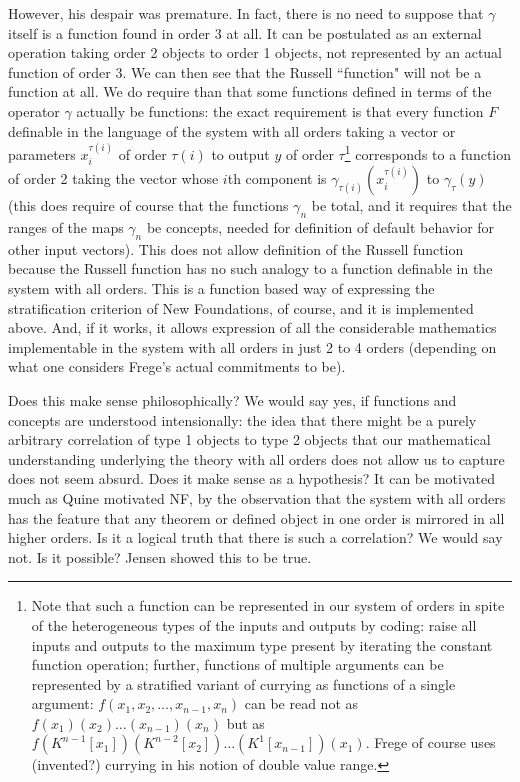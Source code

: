 \documentclass{article}
\begin{document}
{{However, his despair was premature.  In fact, there is no need to suppose that $\gamma$ itself is a function found in order 3 at all.  It can be postulated as an external operation taking order 2 objects to order 1 objects, not represented by an actual function of order 3.  We can then see that the Russell ``function" will not be a function at all.  We do require than that some functions defined in terms of the operator $\gamma$ actually be functions:  the exact requirement is that every function $F$ definable in the language of the system
with all orders taking a vector or parameters $x^{\tau(i)}_i$ of order $\tau(i)$ to output $y$ of order $\tau$\footnote{Note that such a function can be represented in our system of orders in spite of the heterogeneous types of the inputs and outputs by coding:  raise all inputs and outputs to the maximum type present by iterating the constant function operation; further, functions of multiple arguments can be represented by a stratified variant of currying as functions of a single argument:  $f(x_1,x_2,\ldots,x_{n-1},x_n)$ can be read not as $f(x_1)(x_2)\ldots(x_{n-1})(x_n)$ but as $f(K^{n-1}[x_1])(K^{n-2}[x_2])\ldots(K^{1}[x_{n-1}])(x_1)$.  Frege of course uses (invented?) currying in his notion of double value range.} corresponds to a function of order 2 taking the vector whose $i$th component is $\gamma_{\tau(i)}(x^{\tau(i)}_i)$ to $\gamma_{\tau}(y)$ (this does require of course that the functions $\gamma_n$ be total, and it requires that the ranges of the maps $\gamma_n$ be concepts, needed for definition of default behavior for other input vectors).  This does not allow definition of the Russell function because the Russell function has no such analogy to a function definable in the system with all orders.  This is a function based way of expressing the stratification criterion of New Foundations, of course, and it is implemented above.  And, if it works, it allows expression of all the considerable mathematics implementable in the system with all orders in just 2 to 4 orders (depending on what one considers Frege's actual commitments to be).

Does this make sense philosophically?  We would say yes, if functions and concepts are understood intensionally:  the idea that there might be a purely arbitrary correlation of type
1 objects to type 2 objects that our mathematical understanding underlying the theory with all orders does not allow us to capture does not seem absurd.  Does it make sense as a hypothesis?  It can be motivated much as Quine motivated NF, by the observation that the system with all orders has the feature that any theorem or defined object in one order is mirrored in all higher orders.   Is it a logical truth that there is such a correlation?  We would say not.  Is it possible?  Jensen showed this to be true.

}}
\end{document}
